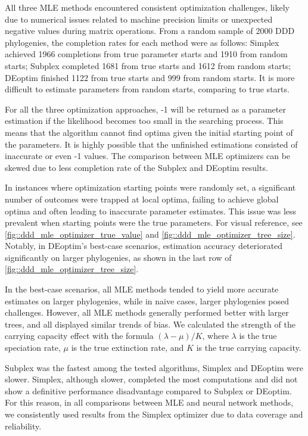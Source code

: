 {All three MLE methods encountered consistent optimization challenges, likely due to numerical issues related to machine precision limits or unexpected negative values during matrix operations. From a random sample of 2000 DDD phylogenies, the completion rates for each method were as follows: Simplex achieved 1966 completions from true parameter starts and 1910 from random starts; Subplex completed 1681 from true starts and 1612 from random starts; DEoptim finished 1122 from true starts and 999 from random starts. It is more difficult to estimate parameters from random starts, comparing to true starts.

For all the three optimization approaches, -1 will be returned as a parameter estimation if the likelihood becomes too small in the searching process. This means that the algorithm cannot find optima given the initial starting point of the parameters. It is highly possible that the unfinished estimations consisted of inaccurate or even -1 values. The comparison between MLE optimizers can be skewed due to less completion rate of the Subplex and DEoptim results.

In instances where optimization starting points were randomly set, a significant number of outcomes were trapped at local optima, failing to achieve global optima and often leading to inaccurate parameter estimates. This issue was less prevalent when starting points were the true parameters. For visual reference, see \autoref{fig::ddd_mle_optimizer_true_value} and \autoref{fig::ddd_mle_optimizer_tree_size}. Notably, in DEoptim's best-case scenarios, estimation accuracy deteriorated significantly on larger phylogenies, as shown in the last row of \autoref{fig::ddd_mle_optimizer_tree_size}.

In the best-case scenarios, all MLE methods tended to yield more accurate estimates on larger phylogenies, while in naive cases, larger phylogenies posed challenges. However, all MLE methods generally performed better with larger trees, and all displayed similar trends of bias. We calculated the strength of the carrying capacity effect with the formula $(\lambda-\mu) / K$, where $\lambda$ is the true speciation rate, $\mu$ is the true extinction rate, and $K$ is the true carrying capacity.

Subplex was the fastest among the tested algorithms, Simplex and DEoptim were slower. Simplex, although slower, completed the most computations and did not show a definitive performance disadvantage compared to Subplex or DEoptim. For this reason, in all comparisons between MLE and neural network methods, we consistently used results from the Simplex optimizer due to data coverage and reliability.

}

